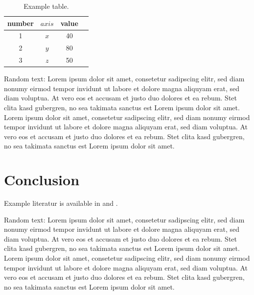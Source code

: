 \documentclass[11pt,a4paper]{article}
\begin{document}
\begin{table}[b!]
  \centering
  \begin{tabular}{|c|c|c|c|}
\hline
number & $axis$ & value  \\   \hline
1 &   $x$     & 40    \\   \hline
2 &   $y$     & 80    \\   \hline
3 &   $z$     & 50    \\   \hline
  \end{tabular}
  \caption{Example table.}
  \label{tab:table1}
\end{table}

Random text: Lorem ipsum dolor sit amet, consetetur sadipscing elitr, sed diam nonumy 
eirmod tempor invidunt ut labore et dolore magna aliquyam erat, sed diam voluptua. At 
vero eos et accusam et justo duo dolores et ea rebum. Stet clita kasd gubergren, no sea 
takimata sanctus est Lorem ipsum dolor sit amet. Lorem ipsum dolor sit amet, consetetur 
sadipscing elitr, sed diam nonumy eirmod tempor invidunt ut labore et dolore magna 
aliquyam erat, sed diam voluptua. At vero eos et accusam et justo duo dolores et ea 
rebum. Stet clita kasd gubergren, no sea takimata sanctus est Lorem ipsum dolor sit amet.

\section{Conclusion}
\label{sec:concl}

Example literatur is available in \cite{shirley:2009} and \cite{seiler:2013}.

Random text: Lorem ipsum dolor sit amet, consetetur sadipscing elitr, sed diam nonumy 
eirmod tempor invidunt ut labore et dolore magna aliquyam erat, sed diam voluptua. At 
vero eos et accusam et justo duo dolores et ea rebum. Stet clita kasd gubergren, no sea 
takimata sanctus est Lorem ipsum dolor sit amet. Lorem ipsum dolor sit amet, consetetur 
sadipscing elitr, sed diam nonumy eirmod tempor invidunt ut labore et dolore magna 
aliquyam erat, sed diam voluptua. At vero eos et accusam et justo duo dolores et ea 
rebum. Stet clita kasd gubergren, no sea takimata sanctus est Lorem ipsum dolor sit amet.

    




\end{document}
